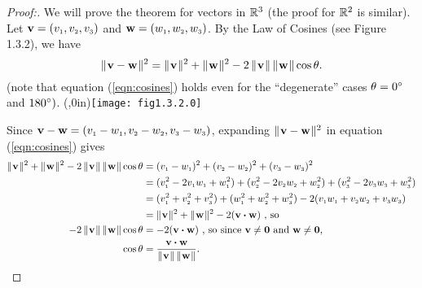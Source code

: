 \begin{proofbar}\vspace{-3mm}\begin{proof}[Proof:]
 We will prove the theorem for vectors in $\Real{3}$ (the proof for $\Real{2}$ is similar). Let
 $\textbf{v} = \vecthree{v}$ and $\textbf{w} = \vecthree{w}$. 
 By the Law of Cosines (see Figure 1.3.2), we
 have
 \begin{equation}\label{eqn:cosines}
  \norm{\textbf{v} - \textbf{w}}^2 = \norm{\textbf{v}}^2 + \norm{\textbf{w}}^2 -
  2\,\norm{\textbf{v}}\,\norm{\textbf{w}} \cos \theta.
 \end{equation}
 (note that equation (\ref{eqn:cosines}) holds even for the ``degenerate'' cases $\theta = 0\Degrees$ and $180\Degrees)$.
 \piccaption[]{}\parpic(\textwidth,0in){\texttt{[image: fig1.3.2.0]}\piccaptioninside}
 \par\mbox{}\newline\vspace{1mm}

 Since $\textbf{v} - \textbf{w} = \vecthreesub{v}{w}$, expanding $\norm{\textbf{v} - \textbf{w}}^2$
 in equation (\ref{eqn:cosines}) gives
 \begin{align*}
  \norm{\textbf{v}}^2 + \norm{\textbf{w}}^2 - 2\,\norm{\textbf{v}}\,\norm{\textbf{w}} \cos \theta &=
  (\ssub{v}{1} - \ssub{w}{1})^2 + (\ssub{v}{2} - \ssub{w}{2})^2 + (\ssub{v}{3} - \ssub{w}{3})^2\\
  &=
  (\ssub{v}{1}^2 - 2\ssub{v}{1}\ssub{w}{1} + \ssub{w}{1}^2) + (\ssub{v}{2}^2 - 2\ssub{v}{2}\ssub{w}{2} + \ssub{w}{2}^2)
  + (\ssub{v}{3}^2 - 2\ssub{v}{3}\ssub{w}{3} + \ssub{w}{3}^2)\\
  &= (\ssub{v}{1}^2 + \ssub{v}{2}^2 + \ssub{v}{3}^2) + (\ssub{w}{1}^2 + \ssub{w}{2}^2 + \ssub{w}{3}^2) -
  2(\ssub{v}{1}\ssub{w}{1} + \ssub{v}{2}\ssub{w}{2} + \ssub{v}{3}\ssub{w}{3})\\
  &=
  \norm{\textbf{v}}^2 + \norm{\textbf{w}}^2 - 2(\Dotprod{\textbf{v}}{\textbf{w}}) \text{~,~so}\\
  -2\,\norm{\textbf{v}}\,\norm{\textbf{w}} \cos \theta &= -2(\Dotprod{\textbf{v}}{\textbf{w}}) \text{~,~so since
  $\textbf{v} \ne \textbf{0}$ and $\textbf{w} \ne \textbf{0}$,}\\
  \cos \theta &= \frac{\Dotprod{\textbf{v}}{\textbf{w}}}{\norm{\textbf{v}} \, \norm{\textbf{w}}}.\qquad\qedhere
 \end{align*}
\end{proof}\vspace{-3mm}\end{proofbar}

